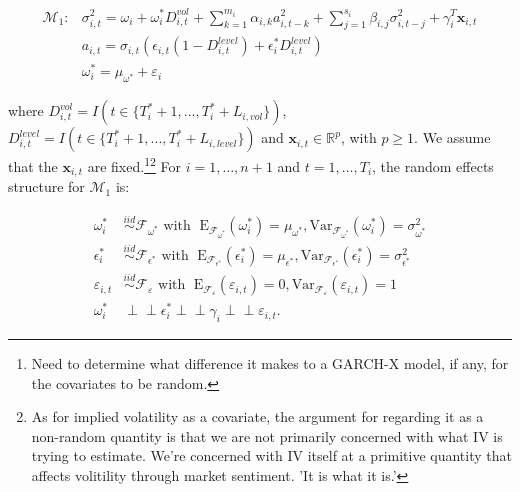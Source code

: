 \documentclass[11pt]{article}
\newcommand{\R}{\mathbb{R}}
\newcommand{\x}{\textbf{x}}
\def\mbf#1{\mathbf{#1}} %
\newcommand{\simiid}{\stackrel{iid}{\sim}} %
\newcommand{\indep}{\perp \!\!\! \perp } %
\def\mrm#1{\mathrm{#1}} %
\def\mc#1{\mathcal{#1}} %
\def\mc#1{\mathcal{#1}}
\theoremstyle{definition}
\begin{document}
\begin{align}
\mc{M}_1 \colon &\sigma^{2}_{i,t} = \omega_{i} + \omega^{*}_i D^{vol}_{i,t} + \sum^{m_{i}}_{k=1}\alpha_{i,k}a^{2}_{i,t-k} + \sum_{j=1}^{s_{i}}\beta_{i,j}\sigma_{i,t-j}^{2} + \gamma_{i}^{T} \x_{i,t}\\
&a_{i,t} = \sigma_{i,t}(\epsilon_{i,t}(1-D^{level}_{i,t}) + \epsilon^{*}_{i}D^{level}_{i,t})\\ 
&\omega_i^{*} = \mu_{\omega^{*}} + \varepsilon_{i} \label{model1}
\end{align}

 where $D^{vol}_{i,t} = I(t \in \{T_i^* + 1,...,T_i^* + L_{i, vol}\})$, $D^{level}_{i,t} = I(t \in \{T_i^* + 1,...,T_i^* + L_{i, level}\})$ 
and $\x_{i,t} \in \R^{p}$, with $p \geq 1$.  We assume that the 
$\mbf{x}_{i,t}$ are fixed.\footnote{Need to determine what difference it makes to a GARCH-X model, if any, for the covariates to be random.}\footnote{As for implied volatility as a covariate, the argument for regarding it as a non-random quantity is that we are not primarily concerned with what IV is trying to estimate.  We're concerned with IV itself at a primitive quantity that affects volitility through market sentiment. 'It is what it is.'}  For $i = 1, \ldots, n+1$ and $t=1, \ldots, T_i$, the random effects structure for $\mc{M}_1$ is:

\begin{align*}
  \omega^{*}_i &\simiid \mc{F}_{\omega^{*}} \text{ with }  \; \mrm{E}_{\mc{F}_{\omega^{*}}}(\omega^{*}_i) = \mu_{\omega^{*}}, \mrm{Var}_{\mc{F}_{\omega^{*}}}(\omega^{*}_i)  = \sigma^2_{\omega^{*}}  \\
  \epsilon^{*}_i &\simiid \mc{F}_{\epsilon^{*}} \text{ with }  \; \mrm{E}_{\mc{F}_{\epsilon^{*}}}(\epsilon^{*}_i) = \mu_{\epsilon^{*}}, \mrm{Var}_{\mc{F}_{\epsilon^{*}}}(\epsilon^{*}_i)  = \sigma^2_{\epsilon^{*}}  \\
  \varepsilon_{i,t} & \simiid  \mc{F}_{\varepsilon} \text{ with }  \; \mrm{E}_{\mc{F}_{\varepsilon}}(\varepsilon_{i,t}) = 0, \mrm{Var}_{\mc{F}_{\varepsilon}}(\varepsilon_{i,t})  = 1 \\
  \omega^{*}_{i} &\indep  \epsilon^{*}_i \indep \gamma_i \indep \varepsilon_{i,t}.
  \end{align*}
\end{document}
